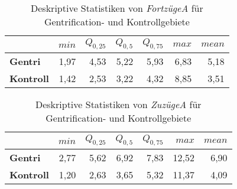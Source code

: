 \begin{table}[h]
\centering
\begin{tabular}{@{}lrrrrrr@{}}
\toprule
               & $min$ & $Q_{0,25}$ & $Q_{0,5}$ & $Q_{0,75}$ & $max$ & $mean$ \\ \midrule
{\bf Gentri}   & 1,97 & 4,53 & 5,22 & 5,93 & 6,83  & 5,18 \\
{\bf Kontroll} & 1,42 & 2,53 & 3,22 & 4,32 & 8,85  & 3,51 \\ \bottomrule
\end{tabular}
\caption{Deskriptive Statistiken von \textit{FortzügeA} für Gentrification- und Kontrollgebiete}
\label{tab:FortzuegeUDAR}
\end{table}

\begin{table}[h]
\centering
\begin{tabular}{@{}lrrrrrr@{}}
\toprule
               & $min$ & $Q_{0,25}$ & $Q_{0,5}$ & $Q_{0,75}$ & $max$ & $mean$ \\ \midrule
{\bf Gentri}   & 2,77  & 5,62       & 6,92      & 7,83       & 12,52 & 6,90   \\
{\bf Kontroll} & 1,20  & 2,63       & 3,65      & 5,32       & 11,37 & 4,09   \\ \bottomrule
\end{tabular}
\caption{Deskriptive Statistiken von \textit{ZuzügeA} für Gentrification- und Kontrollgebiete}
\label{tab:ZuzuegeUDAR}
\end{table}



